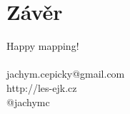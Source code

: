 %
%
%
%
%
%

\section*{Závěr}
\begin{frame}
    Happy mapping!\\
    ~
    \\
    jachym.cepicky@gmail.com\\
    http://les-ejk.cz\\
    @jachymc
\end{frame}



